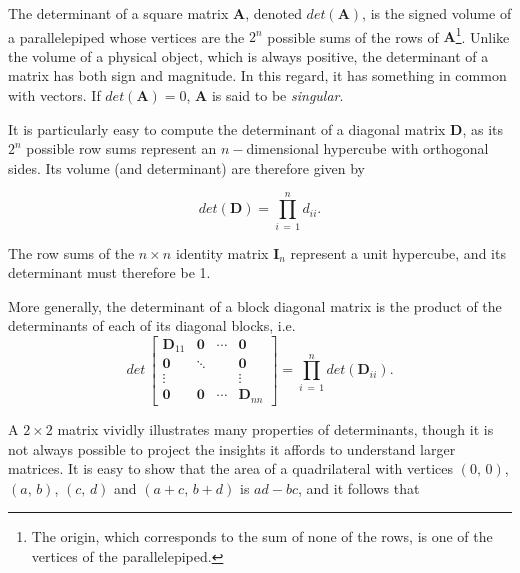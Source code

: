 \documentclass[graybox,envcountchap,sectrefs]{svmono}\usepackage[]{graphicx}\usepackage[]{xcolor}
\begin{document}
\begin{appendices}
The determinant of a square matrix $\mathrm{\mathbf{A}}$, denoted
$det\left(\mathrm{\mathbf{A}}\right)$, is the signed volume of a
parallelepiped whose vertices are the $2^{n}$ possible sums of the
rows of $\mathrm{\mathbf{A}}$\footnote{The origin, which corresponds to the sum of none of the rows, is one
of the vertices of the parallelepiped.}. Unlike the volume of a physical object, which is always positive,
the determinant of a matrix has both sign and magnitude. In this regard,
it has something in common with vectors. If $det\left(\mathrm{\mathbf{A}}\right)=0$,
$\mathrm{\mathbf{A}}$ is said to be \emph{singular}. 

It is particularly easy to compute the determinant of a diagonal matrix
$\mathrm{\mathbf{D}}$, as its $2^{n}$ possible row sums represent
an $n-$dimensional hypercube with orthogonal sides. Its volume (and
determinant) are therefore given by

\begin{equation}
det\left(\mathrm{\mathbf{D}}\right)=\prod_{i\,=\,1}^{n}d_{ii}.\label{eq:DiagonalDeterminant}
\end{equation}

The row sums of the $n\times n$ identity matrix $\mathrm{\mathbf{I}}_{n}$
represent a unit hypercube, and its determinant must therefore be
1. 

More generally, the determinant of a block diagonal matrix is the
product of the determinants of each of its diagonal blocks, i.e.
\begin{equation}
det\,\left[\begin{array}{cccc}
\mathrm{\mathbf{D}}_{11} & \mathrm{\mathbf{0}} & \cdots & \mathrm{\mathbf{0}}\\
\mathrm{\mathbf{0}} & \ddots &  & \mathrm{\mathbf{0}}\\
\vdots &  &  & \vdots\\
\mathrm{\mathbf{0}} & \mathrm{\mathbf{0}} & \cdots & \mathrm{\mathbf{D}}_{nn}
\end{array}\right]=\prod_{i\,=\,1}^{n}det\left(\mathrm{\mathbf{D}}_{ii}\right).\label{eq:BlockDiagonalDeterminant}
\end{equation}

A $2\times2$ matrix vividly illustrates many properties of determinants,
though it is not always possible to project the insights it affords
to understand larger matrices. It is easy to show that the area of
a quadrilateral with vertices $(0,\,0)$, $(a,\,b)$, $(c,\,d)$ and
$(a+c,\,b+d)$ is $ad-bc$, and it follows that


\end{appendices}
\end{document}
